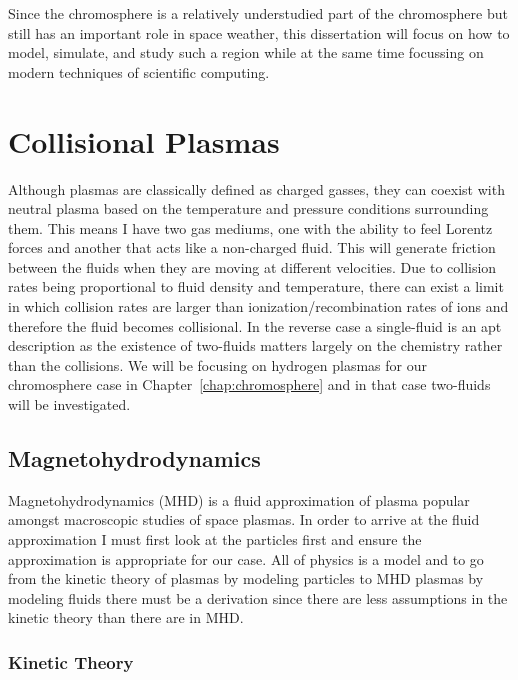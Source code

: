 \documentclass[12pt,upcase]{umlthesis}
\begin{document}
Since the chromosphere is a relatively understudied part of the chromosphere but still has an important role in space weather, this dissertation will focus on how to model, simulate, and study such a region while at the same time focussing on modern techniques of scientific computing.


\chapter{Collisional Plasmas}\label{chap:plasma}

Although plasmas are classically defined as charged gasses, they can coexist with neutral plasma based on the temperature and pressure conditions surrounding them. This means I have two gas mediums, one with the ability to feel Lorentz forces and another that acts like a non-charged fluid. This will generate friction between the fluids when they are moving at different velocities. Due to collision rates being proportional to fluid density and temperature, there can exist a limit in which collision rates are larger than ionization/recombination rates of ions and therefore the fluid becomes collisional. In the reverse case a single-fluid is an apt description as the existence of two-fluids matters largely on the chemistry rather than the collisions. We will be focusing on hydrogen plasmas for our chromosphere case in Chapter~\ref{chap:chromosphere} and in that case two-fluids will be investigated.

\section{Magnetohydrodynamics}\label{sec:mhd}

Magnetohydrodynamics (MHD) is a fluid approximation of plasma popular amongst macroscopic studies of space plasmas. In order to arrive at the fluid approximation I must first look at the particles first and ensure the approximation is appropriate for our case. All of physics is a model and to go from the kinetic theory of plasmas by modeling particles to MHD plasmas by modeling fluids there must be a derivation since there are less assumptions in the kinetic theory than there are in MHD\@.

\subsection{Kinetic Theory}\label{sec:kinetictheory}
\end{document}

